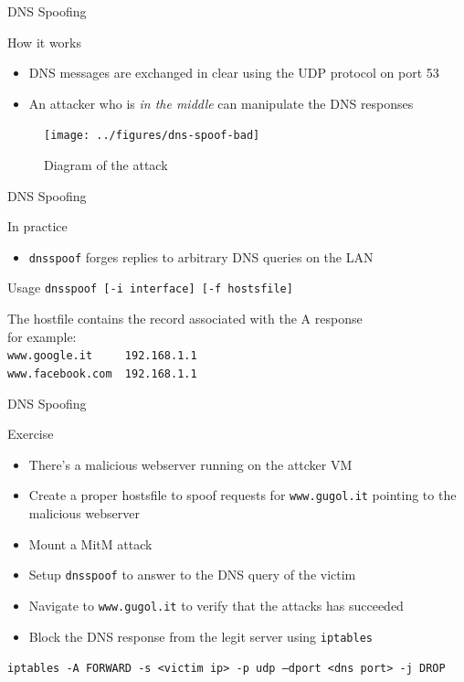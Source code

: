 \documentclass{beamer}
\begin{document}
\begin{frame}{DNS Spoofing}
  \begin{block}{How it works}
    \begin{itemize}
      \item DNS messages are exchanged in clear using the UDP protocol on port 53
      \item An attacker who is \textit{in the middle} can manipulate the DNS responses
    \end{itemize}
  \end{block}
  \begin{figure}
    \texttt{[image: ../figures/dns-spoof-bad]}
    \caption*{Diagram of the attack}
  \end{figure}
\end{frame}
\begin{frame}{DNS Spoofing}
  \begin{block}{In practice}
    \begin{itemize}
      \item \texttt{dnsspoof} forges replies to arbitrary DNS queries on the LAN
    \end{itemize}
  \end{block}
  \begin{block}{Usage}
    \texttt{dnsspoof [-i interface] [-f hostsfile]}
    \begin{block}{}
      The hostfile contains the record associated with the A response\\
      for example:\\
      \texttt{www.google.it  ~~~~192.168.1.1}\\
      \texttt{www.facebook.com   ~192.168.1.1}
    \end{block}
  \end{block}
\end{frame}
\begin{frame}{DNS Spoofing}
  \begin{block}{Exercise}
    \begin{itemize}
      \item There's a malicious webserver running on the attcker VM
      \item Create a proper hostsfile to spoof requests for \texttt{www.gugol.it} pointing to the malicious webserver
      \item Mount a MitM attack
      \item Setup \texttt{dnsspoof} to answer to the DNS query of the victim
      \item Navigate to \texttt{www.gugol.it} to verify that the attacks has succeeded
      \pause
      \item Block the DNS response from the legit server using \texttt{iptables}
    \end{itemize}
  \end{block}
  \pause
  \texttt{iptables -A FORWARD -s <victim ip> -p udp --dport <dns port> -j DROP}
\end{frame}
\end{document}
